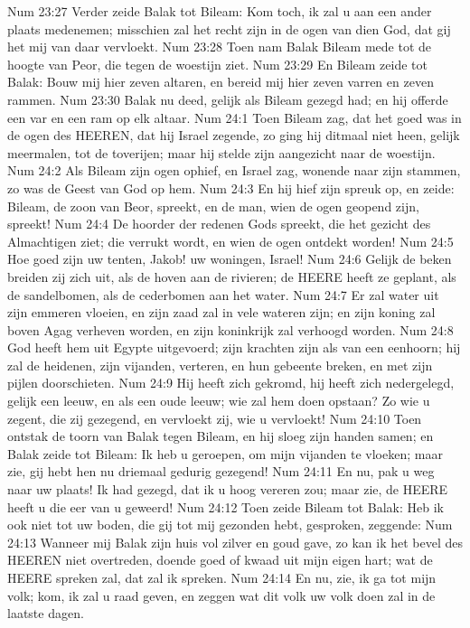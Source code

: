 Num 23:27  Verder zeide Balak tot Bileam: Kom toch, ik zal u aan een ander plaats medenemen; misschien zal het recht zijn in de ogen van dien God, dat gij het mij van daar vervloekt.
Num 23:28  Toen nam Balak Bileam mede tot de hoogte van Peor, die tegen de woestijn ziet.
Num 23:29  En Bileam zeide tot Balak: Bouw mij hier zeven altaren, en bereid mij hier zeven varren en zeven rammen.
Num 23:30  Balak nu deed, gelijk als Bileam gezegd had; en hij offerde een var en een ram op elk altaar.
Num 24:1  Toen Bileam zag, dat het goed was in de ogen des HEEREN, dat hij Israel zegende, zo ging hij ditmaal niet heen, gelijk meermalen, tot de toverijen; maar hij stelde zijn aangezicht naar de woestijn.
Num 24:2  Als Bileam zijn ogen ophief, en Israel zag, wonende naar zijn stammen, zo was de Geest van God op hem.
Num 24:3  En hij hief zijn spreuk op, en zeide: Bileam, de zoon van Beor, spreekt, en de man, wien de ogen geopend zijn, spreekt!
Num 24:4  De hoorder der redenen Gods spreekt, die het gezicht des Almachtigen ziet; die verrukt wordt, en wien de ogen ontdekt worden!
Num 24:5  Hoe goed zijn uw tenten, Jakob! uw woningen, Israel!
Num 24:6  Gelijk de beken breiden zij zich uit, als de hoven aan de rivieren; de HEERE heeft ze geplant, als de sandelbomen, als de cederbomen aan het water.
Num 24:7  Er zal water uit zijn emmeren vloeien, en zijn zaad zal in vele wateren zijn; en zijn koning zal boven Agag verheven worden, en zijn koninkrijk zal verhoogd worden.
Num 24:8  God heeft hem uit Egypte uitgevoerd; zijn krachten zijn als van een eenhoorn; hij zal de heidenen, zijn vijanden, verteren, en hun gebeente breken, en met zijn pijlen doorschieten.
Num 24:9  Hij heeft zich gekromd, hij heeft zich nedergelegd, gelijk een leeuw, en als een oude leeuw; wie zal hem doen opstaan? Zo wie u zegent, die zij gezegend, en vervloekt zij, wie u vervloekt!
Num 24:10  Toen ontstak de toorn van Balak tegen Bileam, en hij sloeg zijn handen samen; en Balak zeide tot Bileam: Ik heb u geroepen, om mijn vijanden te vloeken; maar zie, gij hebt hen nu driemaal gedurig gezegend!
Num 24:11  En nu, pak u weg naar uw plaats! Ik had gezegd, dat ik u hoog vereren zou; maar zie, de HEERE heeft u die eer van u geweerd!
Num 24:12  Toen zeide Bileam tot Balak: Heb ik ook niet tot uw boden, die gij tot mij gezonden hebt, gesproken, zeggende:
Num 24:13  Wanneer mij Balak zijn huis vol zilver en goud gave, zo kan ik het bevel des HEEREN niet overtreden, doende goed of kwaad uit mijn eigen hart; wat de HEERE spreken zal, dat zal ik spreken.
Num 24:14  En nu, zie, ik ga tot mijn volk; kom, ik zal u raad geven, en zeggen wat dit volk uw volk doen zal in de laatste dagen.
